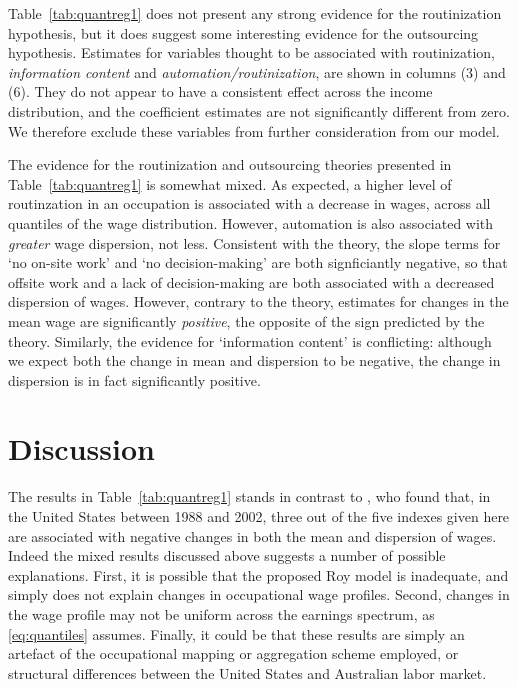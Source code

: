 Table~\ref{tab:quantreg1} does not present any strong evidence for the routinization hypothesis, but it does suggest some interesting evidence for the outsourcing hypothesis. Estimates for variables thought to be associated with routinization, {\em information content} and {\em automation/routinization}, are shown in columns (3) and (6). They do not appear to have a consistent effect across the income distribution, and the coefficient estimates are not significantly different from zero. We therefore exclude these variables from further consideration from our model.

The evidence for the routinization and outsourcing theories presented in Table~\ref{tab:quantreg1} is somewhat mixed. As expected, a higher level of routinzation in an occupation is associated with a decrease in wages, across all quantiles of the wage distribution. However, automation is also associated with {\em greater} wage dispersion, not less. Consistent with the theory, the slope terms for `no on-site work' and `no decision-making' are both signficiantly negative, so that offsite work and a lack of decision-making are both associated with a decreased dispersion of wages. However, contrary to the theory, estimates for changes in the mean wage are significantly {\em positive}, the opposite of the sign predicted by the theory. Similarly, the evidence for `information content' is conflicting: although we expect both the change in mean and dispersion to be negative, the change in dispersion is in fact significantly positive.

\section{Discussion}

The results in Table~\ref{tab:quantreg1} stands in contrast to \citet{Firpo2011}, who found that, in the United States between 1988 and 2002, three out of the five indexes given here are associated with negative changes in both the mean and dispersion of wages. Indeed the mixed results discussed above suggests a number of possible explanations. First, it is possible that the proposed Roy model is inadequate, and simply does not explain changes in occupational wage profiles. Second, changes in the wage profile may not be uniform across the earnings spectrum, as \eqref{eq:quantiles} assumes. Finally, it could be that these results are simply an artefact of the occupational mapping or aggregation scheme employed, or structural differences between the United States and Australian labor market.

